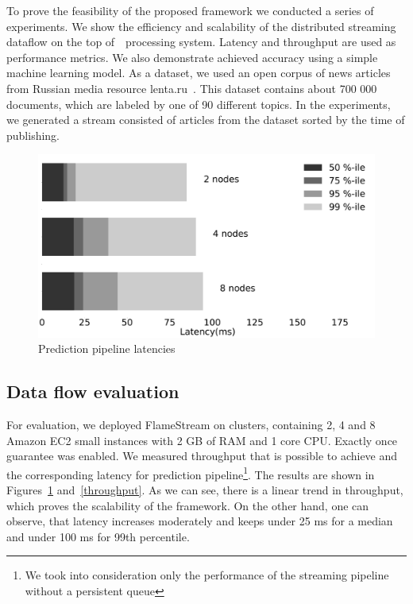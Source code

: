 \label {fs-experiments}

To prove the feasibility of the proposed framework we conducted a series of experiments. We show the efficiency and scalability of the distributed streaming dataflow on the top of~\FlameStream\ processing system. Latency and throughput are used as performance metrics. We also demonstrate achieved accuracy using a simple machine learning model. As a dataset, we used an open corpus of news articles from Russian media resource lenta.ru~\cite{lentaru}. This dataset contains about 700 000 documents, which are labeled by one of 90 different topics. In the experiments, we generated a stream consisted of articles from the dataset sorted by the time of publishing.

\begin{figure}[htbp]
  \centering
  \includegraphics[scale=0.1]{pics/classifier_latencies}
  \caption{Prediction pipeline latencies}
  \label {latencies}
\end{figure}

\subsection{Data flow evaluation}

For evaluation, we deployed FlameStream on clusters, containing 2, 4 and 8 Amazon EC2 small instances with 2 GB of RAM and 1 core CPU. Exactly once guarantee was enabled. We measured throughput that is possible to achieve and the corresponding latency for prediction pipeline\footnote{We took into consideration only the performance of the streaming pipeline without a persistent queue}. The results are shown in Figures~\ref{latencies} and~\ref{throughput}. As we can see, there is a linear trend in throughput, which proves the scalability of the framework. On the other hand, one can observe, that latency increases moderately and keeps under 25 ms for a median and under 100 ms for 99th percentile.

